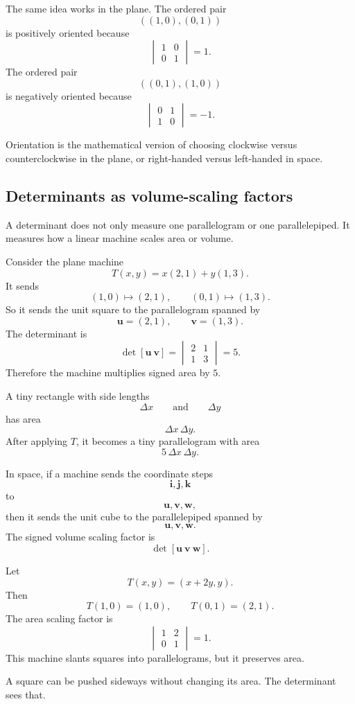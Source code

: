 The same idea works in the plane.  The ordered pair
\[
    ((1,0),(0,1))
\]
is positively oriented because
\[
    \begin{vmatrix}
    1&0\\
    0&1
    \end{vmatrix}
    =
    1.
\]
The ordered pair
\[
    ((0,1),(1,0))
\]
is negatively oriented because
\[
    \begin{vmatrix}
    0&1\\
    1&0
    \end{vmatrix}
    =
    -1.
\]

Orientation is the mathematical version of choosing clockwise versus
counterclockwise in the plane, or right-handed versus left-handed in space.

\subsection{Determinants as volume-scaling factors}

A determinant does not only measure one parallelogram or one parallelepiped.  It
measures how a linear machine scales area or volume.

Consider the plane machine
\[
    T(x,y)=x(2,1)+y(1,3).
\]
It sends
\[
    (1,0)\mapsto (2,1),
    \qquad
    (0,1)\mapsto (1,3).
\]
So it sends the unit square to the parallelogram spanned by
\[
    \mathbf u=(2,1),
    \qquad
    \mathbf v=(1,3).
\]
The determinant is
\[
    \det[\mathbf u\ \mathbf v]
    =
    \begin{vmatrix}
        2&1\\
        1&3
    \end{vmatrix}
    =
    5.
\]
Therefore the machine multiplies signed area by \(5\).

A tiny rectangle with side lengths
\[
    \Delta x
    \qquad\text{and}\qquad
    \Delta y
\]
has area
\[
    \Delta x\,\Delta y.
\]
After applying \(T\), it becomes a tiny parallelogram with area
\[
    5\,\Delta x\,\Delta y.
\]

In space, if a machine sends the coordinate steps
\[
    \mathbf i,\mathbf j,\mathbf k
\]
to
\[
    \mathbf u,\mathbf v,\mathbf w,
\]
then it sends the unit cube to the parallelepiped spanned by
\[
    \mathbf u,\mathbf v,\mathbf w.
\]
The signed volume scaling factor is
\[
    \det[\mathbf u\ \mathbf v\ \mathbf w].
\]

\begin{example}
Let
\[
    T(x,y)=(x+2y,y).
\]
Then
\[
    T(1,0)=(1,0),
    \qquad
    T(0,1)=(2,1).
\]
The area scaling factor is
\[
    \begin{vmatrix}
        1&2\\
        0&1
    \end{vmatrix}
    =
    1.
\]
This machine slants squares into parallelograms, but it preserves area.

A square can be pushed sideways without changing its area.  The determinant sees
that.
\end{example}

